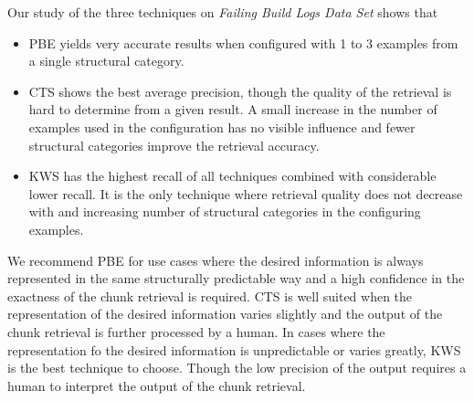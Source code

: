 \documentclass[\myrootdir/main.tex]{subfiles}
\begin{document}
Our study of the three techniques on \emph{Failing Build Logs Data Set} shows that
\begin{itemize}
  \item PBE yields very accurate results when configured with 1 to 3 examples from a single structural category.
  \item CTS shows the best average precision, though the quality of the retrieval is hard to determine from a given result.
  A small increase in the number of examples used in the configuration has no visible influence and fewer structural categories improve the retrieval accuracy.
  \item KWS has the highest recall of all techniques combined with considerable lower recall.
  It is the only technique where retrieval quality does not decrease with and increasing number of structural categories in the configuring examples.
\end{itemize}
We recommend PBE for use cases where the desired information is always represented in the same structurally predictable way and a high confidence in the exactness of the chunk retrieval is required.
CTS is well suited when the representation of the desired information varies slightly and the output of the chunk retrieval is further processed by a human.
In cases where the representation fo the desired information is unpredictable or varies greatly, KWS is the best technique to choose.
Though the low precision of the output requires a human to interpret the output of the chunk retrieval.
\end{document}
